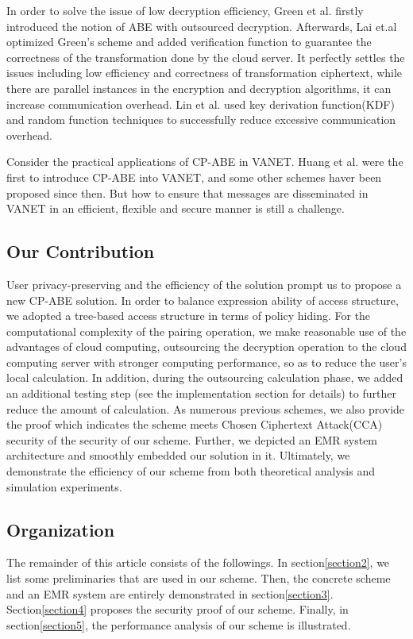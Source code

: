 \documentclass[smallextended]{svjour3}       %
\begin{document}
	In order to solve the issue of low decryption efficiency, Green et al. firstly introduced the notion of ABE with outsourced decryption.
	Afterwards, Lai et.al optimized Green’s scheme and added verification function to guarantee the correctness of the transformation done by the cloud server.
	It perfectly settles the issues including low efficiency and correctness of transformation ciphertext, while there are parallel instances in the encryption and decryption algorithms, it can increase communication overhead.
	Lin et al. used key derivation function(KDF) and random function techniques to successfully reduce excessive communication overhead.


	Consider the practical applications of CP-ABE in VANET. 
	Huang et al. were the first to introduce CP-ABE into VANET, and some other schemes haver been proposed since then.
	But how to ensure that messages are disseminated in VANET in an efficient, flexible and secure manner is still a challenge.  

\subsection{Our Contribution}
	User privacy-preserving and the efficiency of the solution prompt us to propose a new CP-ABE solution. %
	In order to balance expression ability of access structure, we adopted a tree-based access structure in terms of policy hiding. 
	For the computational complexity of the pairing operation, we make reasonable use of the advantages of cloud computing, outsourcing the decryption operation to the cloud computing server with stronger computing performance, so as to reduce the user's local calculation. 
	In addition, during the outsourcing calculation phase, we added an additional testing step (see the implementation section for details) to further reduce the amount of calculation. 
	As numerous previous schemes, we also provide the proof which indicates the scheme meets Chosen Ciphertext Attack(CCA) security of the security of our scheme. 
	Further, we depicted an EMR system architecture and smoothly embedded our solution in it. 
	Ultimately, we demonstrate the efficiency of our scheme from both theoretical analysis and simulation experiments.

\subsection{Organization}
	The remainder of this article consists of the followings. 
	In section\ref{section2}, we list some preliminaries that are used in our scheme. 
	Then, the concrete scheme and an EMR system are entirely demonstrated in section\ref{section3}. 
	Section\ref{section4} proposes the security proof of our scheme. Finally, in section\ref{section5}, the performance analysis of our scheme is illustrated.
\end{document}
